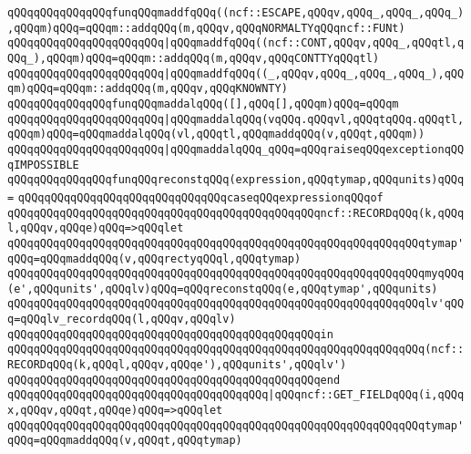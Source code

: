 \verb|qQQqqQQqqQQqqQQqfunqQQqmaddfqQQq((ncf::ESCAPE,qQQqv,qQQq_,qQQq_,qQQq_),qQQqm)qQQq=qQQqm::addqQQq(m,qQQqv,qQQqNORMALTYqQQqncf::FUNt)|\newline
\verb|qQQqqQQqqQQqqQQqqQQqqQQq|\verb#|qQQqmaddfqQQq((ncf::CONT,qQQqv,qQQq_,qQQqtl,qQQq_),qQQqm)qQQq=qQQqm::addqQQq(m,qQQqv,qQQqCONTTYqQQqtl)#\newline
\verb|qQQqqQQqqQQqqQQqqQQqqQQq|\verb#|qQQqmaddfqQQq((_,qQQqv,qQQq_,qQQq_,qQQq_),qQQqm)qQQq=qQQqm::addqQQq(m,qQQqv,qQQqKNOWNTY)#\newline
\newline
\verb|qQQqqQQqqQQqqQQqfunqQQqmaddalqQQq([],qQQq[],qQQqm)qQQq=qQQqm|\newline
\verb|qQQqqQQqqQQqqQQqqQQqqQQq|\verb#|qQQqmaddalqQQq(vqQQq.qQQqvl,qQQqtqQQq.qQQqtl,qQQqm)qQQq=qQQqmaddalqQQq(vl,qQQqtl,qQQqmaddqQQq(v,qQQqt,qQQqm))#\newline
\verb|qQQqqQQqqQQqqQQqqQQqqQQq|\verb#|qQQqmaddalqQQq_qQQq=qQQqraiseqQQqexceptionqQQqIMPOSSIBLE#\newline
\newline
\verb|qQQqqQQqqQQqqQQqfunqQQqreconstqQQq(expression,qQQqtymap,qQQqunits)qQQq=|\newline
\verb|qQQqqQQqqQQqqQQqqQQqqQQqqQQqqQQqcaseqQQqexpressionqQQqof|\newline
\verb|qQQqqQQqqQQqqQQqqQQqqQQqqQQqqQQqqQQqqQQqqQQqqQQqncf::RECORDqQQq(k,qQQql,qQQqv,qQQqe)qQQq=>qQQqlet|\newline
\verb|qQQqqQQqqQQqqQQqqQQqqQQqqQQqqQQqqQQqqQQqqQQqqQQqqQQqqQQqqQQqqQQqtymap'qQQq=qQQqmaddqQQq(v,qQQqrectyqQQql,qQQqtymap)|\newline
\verb|qQQqqQQqqQQqqQQqqQQqqQQqqQQqqQQqqQQqqQQqqQQqqQQqqQQqqQQqqQQqqQQqmyqQQq(e',qQQqunits',qQQqlv)qQQq=qQQqreconstqQQq(e,qQQqtymap',qQQqunits)|\newline
\verb|qQQqqQQqqQQqqQQqqQQqqQQqqQQqqQQqqQQqqQQqqQQqqQQqqQQqqQQqqQQqqQQqlv'qQQq=qQQqlv_recordqQQq(l,qQQqv,qQQqlv)|\newline
\verb|qQQqqQQqqQQqqQQqqQQqqQQqqQQqqQQqqQQqqQQqqQQqqQQqin|\newline
\verb|qQQqqQQqqQQqqQQqqQQqqQQqqQQqqQQqqQQqqQQqqQQqqQQqqQQqqQQqqQQqqQQq(ncf::RECORDqQQq(k,qQQql,qQQqv,qQQqe'),qQQqunits',qQQqlv')|\newline
\verb|qQQqqQQqqQQqqQQqqQQqqQQqqQQqqQQqqQQqqQQqqQQqqQQqend|\newline
\verb|qQQqqQQqqQQqqQQqqQQqqQQqqQQqqQQqqQQqqQQq|\verb#|qQQqncf::GET_FIELDqQQq(i,qQQqx,qQQqv,qQQqt,qQQqe)qQQq=>qQQqlet#\newline
\verb|qQQqqQQqqQQqqQQqqQQqqQQqqQQqqQQqqQQqqQQqqQQqqQQqqQQqqQQqqQQqqQQqtymap'qQQq=qQQqmaddqQQq(v,qQQqt,qQQqtymap)|\newline
